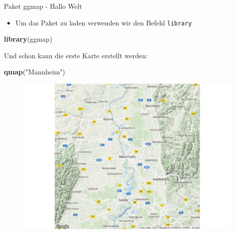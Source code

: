 \documentclass[ignorenonframetext,]{beamer}
\newenvironment{Shaded}{}{}
\newcommand{\KeywordTok}[1]{\textcolor[rgb]{0.00,0.44,0.13}{\textbf{{#1}}}}
\newcommand{\StringTok}[1]{\textcolor[rgb]{0.25,0.44,0.63}{{#1}}}
\newcommand{\NormalTok}[1]{{#1}}
\providecommand{\tightlist}{%
\setlength{\itemsep}{0pt}\setlength{\parskip}{0pt}}
\begin{document}
\begin{frame}[fragile]{Paket ggmap - Hallo Welt}

\begin{itemize}
\tightlist
\item
  Um das Paket zu laden verwenden wir den Befehl \texttt{library}
\end{itemize}

\begin{Shaded}
\begin{Highlighting}[]
\KeywordTok{library}\NormalTok{(ggmap)}
\end{Highlighting}
\end{Shaded}

Und schon kann die erste Karte erstellt werden:

\begin{Shaded}
\begin{Highlighting}[]
\KeywordTok{qmap}\NormalTok{(}\StringTok{"Mannheim"}\NormalTok{)}
\end{Highlighting}
\end{Shaded}

\begin{figure}[htbp]
\centering
\includegraphics{RSocialScience2_files/figure-beamer/unnamed-chunk-26-1.pdf}
\caption{}
\end{figure}

\end{frame}
\end{document}
